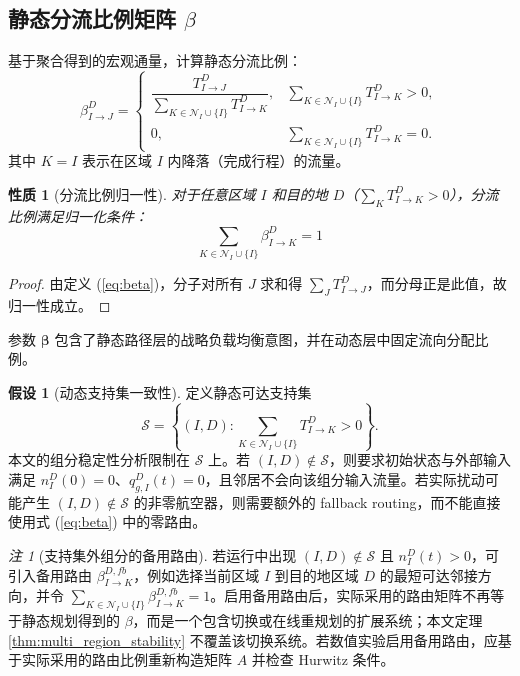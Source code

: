 \documentclass[a4paper,12pt]{article}
\theoremstyle{plain}
\newtheorem{property}[theorem]{性质}
\theoremstyle{definition}
\newtheorem{assumption}[theorem]{假设}
\theoremstyle{remark}
\newtheorem{remark}[theorem]{注}
\begin{document}
\subsection{静态分流比例矩阵 \texorpdfstring{$\beta$}{beta}}
基于聚合得到的宏观通量，计算静态分流比例：
\begin{equation} \label{eq:beta}
    \beta_{I \to J}^D =
    \begin{cases}
    \dfrac{T_{I \to J}^D}{\sum_{K \in \mathcal{N}_I \cup \{I\}} T_{I \to K}^D}, & \sum_{K \in \mathcal{N}_I \cup \{I\}} T_{I \to K}^D>0,\\[1.2em]
    0, & \sum_{K \in \mathcal{N}_I \cup \{I\}} T_{I \to K}^D=0 .
    \end{cases}
\end{equation}
其中 $K = I$ 表示在区域 $I$ 内降落（完成行程）的流量。

\begin{property}[分流比例归一性]\label{prop:beta_normalization}
对于任意区域 $I$ 和目的地 $D$（$\sum_K T_{I \to K}^D > 0$），分流比例满足归一化条件：
\begin{equation}
    \sum_{K \in \mathcal{N}_I \cup \{I\}} \beta_{I \to K}^D = 1
\end{equation}
\end{property}

\begin{proof}
由定义 (\ref{eq:beta})，分子对所有 $J$ 求和得 $\sum_J T_{I \to J}^D$，而分母正是此值，故归一性成立。
\end{proof}

参数 $\bm{\beta}$ 包含了静态路径层的战略负载均衡意图，并在动态层中固定流向分配比例。

\begin{assumption}[动态支持集一致性]\label{asm:support_consistency}
定义静态可达支持集
\begin{equation}\label{eq:support_set}
    \mathcal S=\left\{(I,D):\sum_{K\in\mathcal N_I\cup\{I\}}T_{I\to K}^D>0\right\}.
\end{equation}
本文的组分稳定性分析限制在 $\mathcal S$ 上。若 $(I,D)\notin\mathcal S$，则要求初始状态与外部输入满足 $n_I^D(0)=0$、$q_{g,I}^D(t)=0$，且邻居不会向该组分输入流量。若实际扰动可能产生 $(I,D)\notin\mathcal S$ 的非零航空器，则需要额外的 fallback routing，而不能直接使用式 (\ref{eq:beta}) 中的零路由。
\end{assumption}

\begin{remark}[支持集外组分的备用路由]\label{rem:fallback_routing}
若运行中出现 $(I,D)\notin\mathcal S$ 且 $n_I^D(t)>0$，可引入备用路由 $\beta_{I\to K}^{D,fb}$，例如选择当前区域 $I$ 到目的地区域 $D$ 的最短可达邻接方向，并令 $\sum_{K\in\mathcal N_I\cup\{I\}}\beta_{I\to K}^{D,fb}=1$。启用备用路由后，实际采用的路由矩阵不再等于静态规划得到的 $\beta$，而是一个包含切换或在线重规划的扩展系统；本文定理 \ref{thm:multi_region_stability} 不覆盖该切换系统。若数值实验启用备用路由，应基于实际采用的路由比例重新构造矩阵 $A$ 并检查 Hurwitz 条件。
\end{remark}
\end{document}
